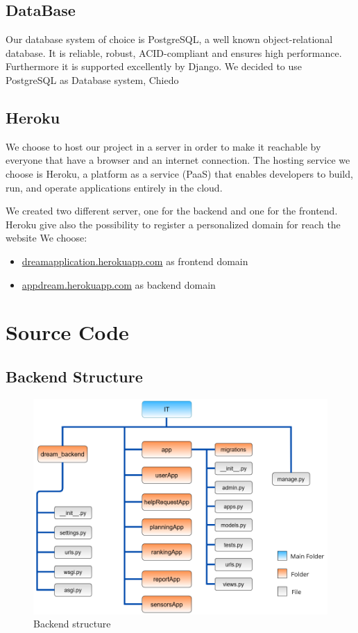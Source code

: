 \documentclass[table, 12pt]{article}
\begin{document}
\subsection{DataBase}
Our database system of choice is PostgreSQL, a well known object-relational database. It is reliable, robust, ACID-compliant and ensures high performance. 
Furthermore it is supported excellently by Django.
We decided to use PostgreSQL as Database system, Chiedo

\subsection{Heroku}
We choose to host our project in a server in order to make it reachable by everyone
that have a browser and an internet connection.
The hosting service we choose is Heroku, a platform as a service (PaaS)
that enables developers to build, run, and operate applications entirely
in the cloud.

We created two different server, one for the backend and one for the frontend.
Heroku give also the possibility to register a personalized domain for reach the
website
We choose:
\begin{itemize}
    \item \url{dreamapplication.herokuapp.com} as frontend domain
    \item \url{appdream.herokuapp.com} as backend domain
\end{itemize}



\section{Source Code}
\subsection{Backend Structure}
\begin{center}
    \begin{figure}[H]
        \includegraphics[scale=0.65, center]{assets/backend_structure.png}
        \caption{Backend structure}
        \label{fig: backend_structure}
    \end{figure}
\end{center}
\end{document}
